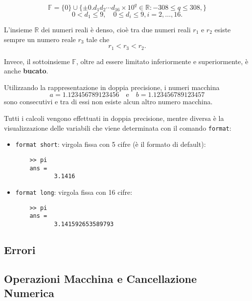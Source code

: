 \documentclass{article}
\theoremstyle{plain}
\theoremstyle{definition}
\theoremstyle{remark}
\begin{document}
\[
\mathbb{F} = \{0\} \cup \{\pm 0.d_1 d_2 \cdots d_{16} \times 10^q \in \mathbb{R} : -308 \leq q \leq 308, \}
\]
\[
0 < d_1 \leq 9, \quad 0 \leq d_i \leq 9, i=2, \dots, 16.
\]

L'insieme $\mathbb{R}$ dei numeri reali è denso, cioè tra due numeri reali $r_1$ e $r_2$ esiste sempre un numero reale $r_3$ tale che
\[
r_1 < r_3 < r_2.
\]

Invece, il sottoinsieme $\mathbb{F}$, oltre ad essere limitato inferiormente e superiormente, è anche \textbf{bucato}.

Utilizzando la rappresentazione in doppia precisione, i numeri macchina
\[
a = 1.123456789123456 \quad \text{e} \quad b = 1.123456789123457
\]
sono consecutivi e tra di essi non esiste alcun altro numero macchina.

Tutti i calcoli vengono effettuati in doppia precisione, mentre diversa è la visualizzazione delle variabili che viene determinata con il comando \texttt{format}:

\begin{itemize}
    \item \texttt{format short}: virgola fissa con 5 cifre (è il formato di default):
    
    \begin{verbatim}
    >> pi
    ans =
           3.1416
    \end{verbatim}

    \item \texttt{format long}: virgola fissa con 16 cifre:

    \begin{verbatim}
    >> pi
    ans =
           3.141592653589793
    \end{verbatim}
\end{itemize}


\subsection{Errori}


\subsection{Operazioni Macchina e Cancellazione Numerica}
\end{document}
